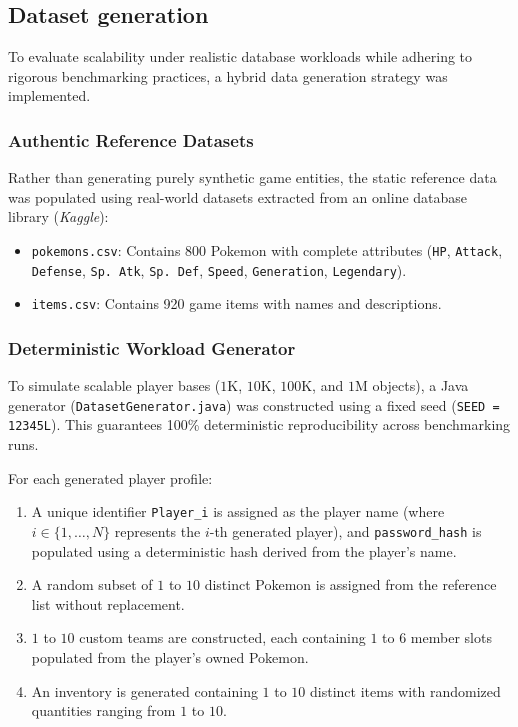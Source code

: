 \documentclass{article}
\begin{document}
\subsection{Dataset generation}
\label{subsec:dataset}
To evaluate scalability under realistic database workloads while adhering to rigorous benchmarking practices, a hybrid data generation strategy was implemented.

\subsubsection{Authentic Reference Datasets}
Rather than generating purely synthetic game entities, the static reference data was populated using real-world datasets extracted from an online database library (\emph{Kaggle}):
\begin{itemize}
    \item \texttt{pokemons.csv}\cite{kaggle_pokemon}: Contains 800 Pokemon with complete attributes (\texttt{HP}, \texttt{Attack}, \texttt{Defense}, \texttt{Sp. Atk}, \texttt{Sp. Def}, \texttt{Speed}, \texttt{Generation}, \texttt{Legendary}).
    \item \texttt{items.csv}\cite{kaggle_item}: Contains 920 game items with names and descriptions.
\end{itemize}

\subsubsection{Deterministic Workload Generator}
To simulate scalable player bases ($1\text{K}$, $10\text{K}$, $100\text{K}$, and $1\text{M}$ objects), a Java generator (\texttt{DatasetGenerator.java}) was constructed using a fixed seed (\texttt{SEED = 12345L}). This guarantees 100\% deterministic reproducibility across benchmarking runs.

For each generated player profile:
\begin{enumerate}
    \item A unique identifier \texttt{Player\_i} is assigned as the player name (where $i \in \{1, \dots, N\}$ represents the $i$-th generated player), and \texttt{password\_hash} is populated using a deterministic hash derived from the player's name.
    \item A random subset of $1$ to $10$ distinct Pokemon is assigned from the reference list without replacement.
    \item $1$ to $10$ custom teams are constructed, each containing $1$ to $6$ member slots populated from the player's owned Pokemon.
    \item An inventory is generated containing $1$ to $10$ distinct items with randomized quantities ranging from $1$ to $10$.
\end{enumerate}
\end{document}
